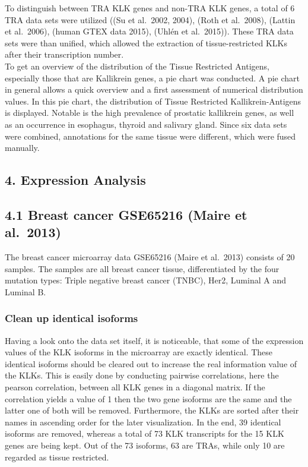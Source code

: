 \documentclass[
]{article}
\begin{document}
To distinguish between TRA KLK genes and non-TRA KLK genes, a total of 6
TRA data sets were utilized ((Su et al.~2002, 2004), (Roth et al.~2008),
(Lattin et al.~2006), (human GTEX data 2015), (Uhlén et al.~2015)).
These TRA data sets were than unified, which allowed the extraction of
tissue-restricted KLKs after their transcription number.\\
To get an overview of the distribution of the Tissue Restricted
Antigens, especially those that are Kallikrein genes, a pie chart was
conducted. A pie chart in general allows a quick overview and a first
assessment of numerical distribution values. In this pie chart, the
distribution of Tissue Restricted Kallikrein-Antigens is displayed.
Notable is the high prevalence of prostatic kallikrein genes, as well as
an occurrence in esophagus, thyroid and salivary gland. Since six data
sets were combined, annotations for the same tissue were different,
which were fused manually.

\hypertarget{expression-analysis}{%
\subsection{4. Expression Analysis}\label{expression-analysis}}

\hypertarget{breast-cancer-gse65216-maire-et-al.-2013}{%
\subsection{4.1 Breast cancer GSE65216 (Maire et
al.~2013)}\label{breast-cancer-gse65216-maire-et-al.-2013}}

The breast cancer microarray data GSE65216 (Maire et al.~2013) consists
of 20 samples. The samples are all breast cancer tissue, differentiated
by the four mutation types: Triple negative breast cancer (TNBC), Her2,
Luminal A and Luminal B.

\hypertarget{clean-up-identical-isoforms}{%
\subsubsection{Clean up identical
isoforms}\label{clean-up-identical-isoforms}}

Having a look onto the data set itself, it is noticeable, that some of
the expression values of the KLK isoforms in the microarray are exactly
identical. These identical isoforms should be cleared out to increase
the real information value of the KLKs. This is easily done by
conducting pairwise correlations, here the pearson correlation, between
all KLK genes in a diagonal matrix. If the correlation yields a value of
1 then the two gene isoforms are the same and the latter one of both
will be removed. Furthermore, the KLKs are sorted after their names in
ascending order for the later visualization. In the end, 39 identical
isoforms are removed, whereas a total of 73 KLK transcripts for the 15
KLK genes are being kept. Out of the 73 isoforms, 63 are TRAs, while
only 10 are regarded as tissue restricted.
\end{document}
